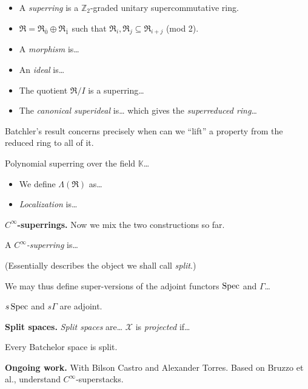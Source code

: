\begin{itemize}
\item A {\it superring} is a
$\mathbb{Z}_2$-graded unitary
supercommutative ring.
\item
$\mathfrak{R}=\mathfrak{R}_{\overline{0}}
\oplus \mathfrak{R}_{\overline{1}}$
such that $\mathfrak{R}_i,
\mathfrak{R}_j \subseteq
\mathfrak{R}_{i+j}$ (mod 2).
\item A {\it morphism} is…
\item An {\it ideal} is…
\item The quotient $\mathfrak{R}/I$
is a superring…
\item The {\it canonical superideal} is…
which gives the {\it superreduced ring}…
\end{itemize}

\noindent
Batchler's result concerns precisely when
can we ``lift'' a property from the reduced
ring to all of it.

\begin{example}
\label{example-polynomial-superring}
Polynomial superring over the field
$\mathbb{K}$…
\end{example}

\begin{itemize}
\item We define $\Lambda(\mathfrak{R})$
as…
\item {\it Localization} is…
\end{itemize}

\medskip\noindent
{\bf $C^\infty$-superrings.}
Now we mix the two constructions so far.

\begin{definition}
\label{definition-cinf-superring}
A {\it $C^\infty$-superring} is…
\end{definition}



\begin{proposition}
\label{proposition-superring}
(Essentially describes the object
we shall call {\it split}.)
\end{proposition}

 We may thus define
super-versions of the adjoint functors
$\mathop{\mathrm{Spec}}$ and $\Gamma$…

\begin{theorem}[A]
\label{theorem-a-superring}
$s\mathop{\mathrm{Spec}}$ and $s\Gamma$ are adjoint.
\end{theorem}

\begin{theorem}[B]
\label{theorem-b-superring}
\end{theorem}

\medskip\noindent
{\bf Split spaces.}
{\it Split spaces} are… $\mathcal{X}$ is
{\it projected} if…

\begin{theorem}[C]
\label{theorem-c-superring}
Every Batchelor space is split.
\end{theorem}


\medskip\noindent
{\bf Ongoing work.}
With Bilson Castro and Alexander Torres.
Based on Bruzzo et al., understand
$C^\infty$-superstacks.


